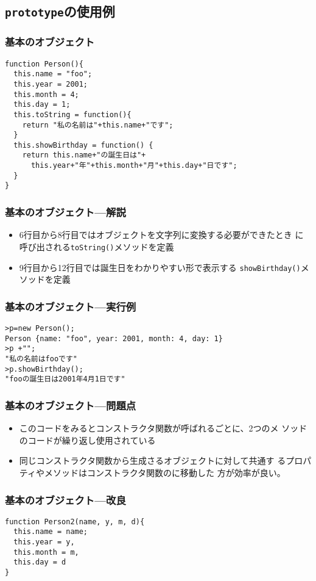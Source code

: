 \documentclass[dvipsk]{beamer}
\begin{document}
 \subsection{\protect\texttt{prototype}の使用例}
\begin{frame}[containsverbatim]
 \frametitle{基本のオブジェクト}
\begin{verbatim}
function Person(){
  this.name = "foo";
  this.year = 2001;
  this.month = 4;
  this.day = 1;
  this.toString = function(){
    return "私の名前は"+this.name+"です";
  }
  this.showBirthday = function() {
    return this.name+"の誕生日は"+
      this.year+"年"+this.month+"月"+this.day+"日です";
  }
}
\end{verbatim}
 \end{frame}
\begin{frame}[containsverbatim]
 \frametitle{基本のオブジェクト---解説}
 \begin{itemize}
  \item 6行目から8行目ではオブジェクトを文字列に変換する必要ができたとき
        に呼び出される\texttt{toString()}メソッドを定義
  \item 9行目から12行目では誕生日をわかりやすい形で表示する
        \texttt{showBirthday()}メソッドを定義
 \end{itemize}
 \end{frame}
\begin{frame}[containsverbatim]
 \frametitle{基本のオブジェクト---実行例}
\begin{verbatim}
>p=new Person();
Person {name: "foo", year: 2001, month: 4, day: 1}
>p +"";
"私の名前はfooです"
>p.showBirthday();
"fooの誕生日は2001年4月1日です"
\end{verbatim}
 \end{frame}
\begin{frame}[containsverbatim]
 \frametitle{基本のオブジェクト---問題点}
 \begin{itemize}
  \item このコードをみるとコンストラクタ関数が呼ばれるごとに、2つのメ
 ソッドのコードが繰り返し使用されている
  \item 同じコンストラクタ関数から生成さるオブジェクトに対して共通す
 るプロパティやメソッドはコンストラクタ関数のに移動した
 方が効率が良い。
 \end{itemize}
 \end{frame}
\begin{frame}[containsverbatim]
 \frametitle{基本のオブジェクト---改良}
\begin{verbatim}
function Person2(name, y, m, d){
  this.name = name;
  this.year = y,
  this.month = m,
  this.day = d
}
\end{verbatim}
 \end{frame}
\end{document}
